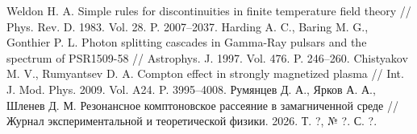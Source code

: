 \documentclass[14pt, russian]{article}
\begin{document}
\begin{thebibliography}{}
%
Weldon H. A. Simple rules for discontinuities in finite temperature field theory
// Phys. Rev. D. 1983. Vol. 28. P. 2007–2037.
%
Harding A. C., Baring M. G., Gonthier P. L. Photon splitting cascades in
Gamma-Ray pulsars and the spectrum of PSR1509-58 // Astrophys. J. 1997.
Vol. 476. P. 246–260.
%
Chistyakov M. V., Rumyantsev D. A. Compton effect in strongly magnetized
plasma // Int. J. Mod. Phys. 2009. Vol. A24. P. 3995–4008.
%
Румянцев Д. А., Ярков А. А., Шленев Д. М. Резонансное комптоновское рассеяние в замагниченной среде // Журнал экспериментальной
и теоретической физики. 2026. Т. ?, № ?. С. ?.
\end{thebibliography}
\end{document}
